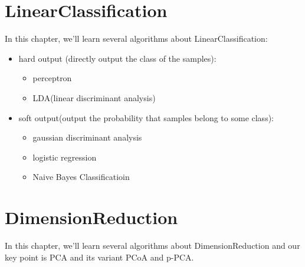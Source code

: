 \documentclass{report}
\begin{document}
\chapter{LinearClassification}
In this chapter, we'll learn several algorithms about LinearClassification:
\begin{itemize}
	\item hard output (directly output the class of the samples):
	\begin{itemize}
		\item perceptron
		\item LDA(linear discriminant analysis)
	\end{itemize}
	\item soft output(output the probability that samples belong to some class):
	\begin{itemize}
	\item gaussian discriminant analysis
	\item logistic regression
	\item Naive Bayes Classificatioin
	\end{itemize}
\end{itemize}






\chapter{DimensionReduction}
In this chapter, we'll learn several algorithms about DimensionReduction and our key point is PCA and its variant PCoA and p-PCA.



\end{document}
